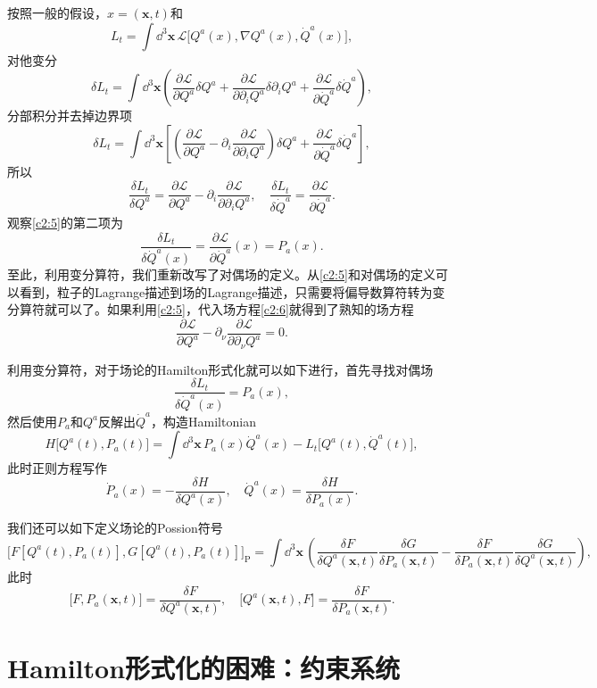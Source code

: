 按照一般的假设，$x=(\bm{x},t)$和
\[
	L_t=\int \dd^3 \bm{x} \,\mathcal{L}\bigl[Q^a(x),\nabla Q^a(x),\dot{Q}^a(x)\bigr],
\]
对他变分
\[
	\delta L_t=\int \dd^3 \bm{x} \left(\frac{\partial \mathcal{L}}{\partial Q^a}\delta Q^a+\frac{\partial \mathcal{L}}{\partial \partial_iQ^a}\delta\partial_iQ^a+\frac{\partial \mathcal{L}}{\partial \dot{Q}^a}\delta\dot{Q}^a\right),
\]
分部积分并去掉边界项
\[
	\delta L_t=\int \dd^3 \bm{x} \left[\left(\frac{\partial \mathcal{L}}{\partial Q^a}-\partial_i\frac{\partial \mathcal{L}}{\partial \partial_iQ^a}\right)\delta Q^a+\frac{\partial \mathcal{L}}{\partial \dot{Q}^a}\delta\dot{Q}^a\right],
\]
所以
\begin{equation}
	\frac{\delta L_t}{\delta Q^a}=\frac{\partial \mathcal{L}}{\partial Q^a}-\partial_i\frac{\partial \mathcal{L}}{\partial \partial_iQ^a},\quad \frac{\delta L_t}{\delta \dot{Q}^a}=\frac{\partial \mathcal{L}}{\partial \dot{Q}^a}.
	\label{c2:5}
\end{equation}
观察\eqref{c2:5}的第二项为
\[
	\frac{\delta L_t}{\delta \dot{Q}^a(x)}=\frac{\partial \mathcal{L}}{\partial \dot{Q}^a}(x)=P_a(x).
\]
至此，利用变分算符，我们重新改写了对偶场的定义。从\eqref{c2:5}和对偶场的定义可以看到，粒子的Lagrange描述到场的Lagrange描述，只需要将偏导数算符转为变分算符就可以了。如果利用\eqref{c2:5}，代入场方程\eqref{c2:6}就得到了熟知的场方程
\[
	\frac{\partial \mathcal{L}}{\partial Q^a}-\partial_\nu\frac{\partial \mathcal{L}}{\partial \partial_\nu Q^a}=0.
\]

利用变分算符，对于场论的Hamilton形式化就可以如下进行，首先寻找对偶场
\[
	\frac{\delta L_t}{\delta \dot{Q}^a(x)}=P_a(x),
\]
然后使用$P_a$和$Q^a$反解出$\dot{Q}^a$，构造Hamiltonian
\[
	H\bigl[Q^a(t),P_a(t)\bigr]=\int \dd^3 \bm{x}\,P_a(x)\dot{Q}^a(x)-L_t\bigl[Q^a(t),\dot{Q}^a(t)\bigr],
\]
此时正则方程写作
\[
	\dot{P}_a(x)=-\frac{\delta H}{\delta Q^a(x)},\quad \dot{Q}^a(x)=\frac{\delta H}{\delta P_a(x)}.
\]

我们还可以如下定义场论的Possion符号
\[
	\bigl[F[Q^a(t),P_a(t)],G[Q^a(t),P_a(t)]\bigr]_{\mathrm{P}}=\int\dd^3 \bm{x} \,\left(\frac{\delta F}{\delta Q^a(\bm{x},t)}\frac{\delta G}{\delta P_a(\bm{x},t)}-\frac{\delta F}{\delta P_a(\bm{x},t)}\frac{\delta G}{\delta Q^a(\bm{x},t)}\right),
\]
此时
\[
	\bigl[F,P_a(\bm{x},t)\bigr]=\frac{\delta F}{\delta Q^a(\bm{x},t)},\quad \bigl[Q^a(\bm{x},t),F\bigr]=\frac{\delta F}{\delta P_a(\bm{x},t)}.
\]

\section{Hamilton形式化的困难：约束系统}
